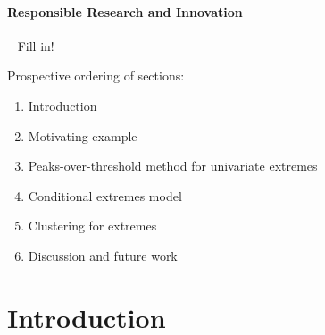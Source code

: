 \documentclass{article}
\numberwithin{equation}{section}
\begin{document}
\begin{center}
\paragraph{Responsible Research and Innovation} ~\linebreak
{}
Fill in!

\end{center}

\newpage

\tableofcontents

\newpage

Prospective ordering of sections:
\begin{enumerate}
  \item Introduction
  \item Motivating example
  \item Peaks-over-threshold method for univariate extremes
  \item Conditional extremes model
  \item Clustering for extremes
  \item Discussion and future work
\end{enumerate}

\section{Introduction}\label{sec:intro}

\end{document}
